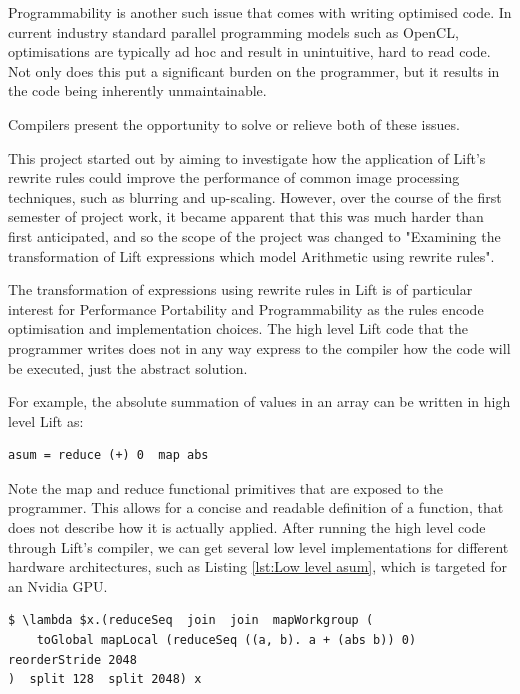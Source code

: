 \documentclass{l4proj}
\begin{document}
Programmability is another such issue that comes with writing optimised code. In current industry standard parallel programming models such as OpenCL, optimisations are typically ad hoc and result in unintuitive, hard to read code. Not only does this put a significant burden on the programmer, but it results in the code being inherently unmaintainable.


Compilers present the opportunity to solve or relieve both of these issues.

This project started out by aiming to investigate how the application of Lift's rewrite rules could improve the performance of common image processing techniques, such as blurring and up-scaling. However, over the course of the first semester of project work, it became apparent that this was much harder than first anticipated, and so the scope of the project was changed to "Examining the transformation of Lift expressions which model Arithmetic using rewrite rules". 

The transformation of expressions using rewrite rules in Lift is of particular interest for Performance Portability and Programmability as the rules encode optimisation and implementation choices. The high level Lift code that the programmer writes does not in any way express to the compiler how the code will be executed, just the abstract solution. 


For example, the absolute summation of values in an array can be written in high level Lift as:
\begin{lstlisting}[caption={High level Description of Absolute Summation \citep{steuwer_generating_icfp}}, label={lst:Lift high level asum}]
    asum = reduce (+) 0  map abs 
\end{lstlisting}
    
Note the map and reduce functional primitives that are exposed to the programmer. This allows for a concise and readable definition of a function, that does not describe how it is actually applied. After running the high level code through Lift's compiler, we can get several low level implementations for different hardware architectures, such as Listing \ref{lst:Low level asum}, which is targeted for an Nvidia GPU.


\begin{lstlisting}[mathescape, caption={Low Level implementation of Listing \ref{lst:Lift high level asum}  \citep{steuwer_generating_icfp}, targeting an Nvidia GPU}, label={lst:Low level asum}]
$ \lambda $x.(reduceSeq  join  join  mapWorkgroup (
    toGlobal mapLocal (reduceSeq ((a, b). a + (abs b)) 0) reorderStride 2048
)  split 128  split 2048) x
\end{lstlisting}
    
\end{document}
